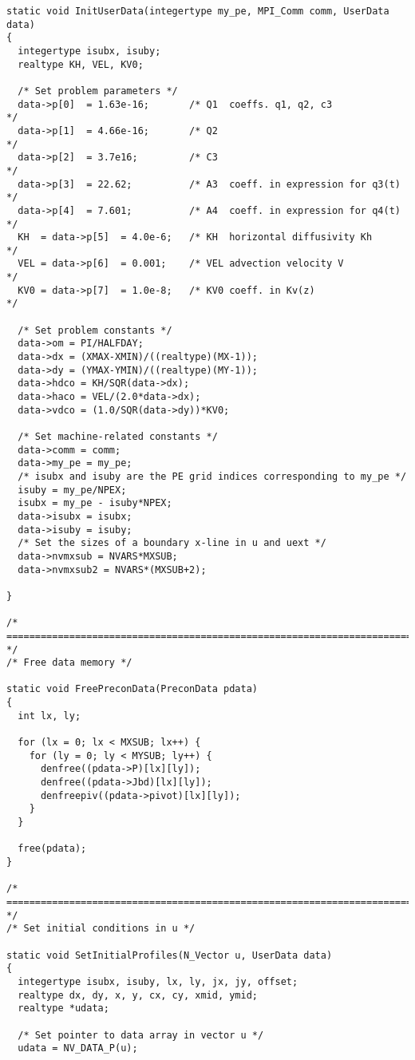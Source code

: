 \begin{verbatim}
static void InitUserData(integertype my_pe, MPI_Comm comm, UserData data)
{
  integertype isubx, isuby;
  realtype KH, VEL, KV0;

  /* Set problem parameters */
  data->p[0]  = 1.63e-16;       /* Q1  coeffs. q1, q2, c3             */
  data->p[1]  = 4.66e-16;       /* Q2                                 */
  data->p[2]  = 3.7e16;         /* C3                                 */
  data->p[3]  = 22.62;          /* A3  coeff. in expression for q3(t) */
  data->p[4]  = 7.601;          /* A4  coeff. in expression for q4(t) */
  KH  = data->p[5]  = 4.0e-6;   /* KH  horizontal diffusivity Kh      */ 
  VEL = data->p[6]  = 0.001;    /* VEL advection velocity V           */
  KV0 = data->p[7]  = 1.0e-8;   /* KV0 coeff. in Kv(z)                */ 

  /* Set problem constants */
  data->om = PI/HALFDAY;
  data->dx = (XMAX-XMIN)/((realtype)(MX-1));
  data->dy = (YMAX-YMIN)/((realtype)(MY-1));
  data->hdco = KH/SQR(data->dx);
  data->haco = VEL/(2.0*data->dx);
  data->vdco = (1.0/SQR(data->dy))*KV0;

  /* Set machine-related constants */
  data->comm = comm;
  data->my_pe = my_pe;
  /* isubx and isuby are the PE grid indices corresponding to my_pe */
  isuby = my_pe/NPEX;
  isubx = my_pe - isuby*NPEX;
  data->isubx = isubx;
  data->isuby = isuby;
  /* Set the sizes of a boundary x-line in u and uext */
  data->nvmxsub = NVARS*MXSUB;
  data->nvmxsub2 = NVARS*(MXSUB+2);

}

/* ======================================================================= */
/* Free data memory */

static void FreePreconData(PreconData pdata)
{
  int lx, ly;

  for (lx = 0; lx < MXSUB; lx++) {
    for (ly = 0; ly < MYSUB; ly++) {
      denfree((pdata->P)[lx][ly]);
      denfree((pdata->Jbd)[lx][ly]);
      denfreepiv((pdata->pivot)[lx][ly]);
    }
  }

  free(pdata);
}

/* ======================================================================= */
/* Set initial conditions in u */

static void SetInitialProfiles(N_Vector u, UserData data)
{
  integertype isubx, isuby, lx, ly, jx, jy, offset;
  realtype dx, dy, x, y, cx, cy, xmid, ymid;
  realtype *udata;

  /* Set pointer to data array in vector u */
  udata = NV_DATA_P(u);


\end{verbatim}
